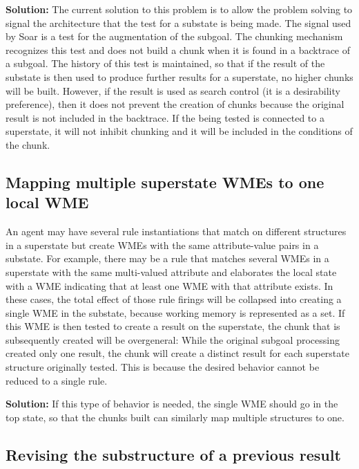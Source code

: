 \textbf{Solution:} The current solution to this problem is to allow the
problem solving to signal the architecture that the test for a substate is
being made.  The signal used by Soar is a test for the  augmentation of the subgoal.  The chunking mechanism recognizes this test
and does not build a chunk when it is found in a backtrace of a subgoal.  The
history of this test is maintained, so that if the result of the substate is
then used to produce further results for a superstate, no higher chunks will
be built.  However, if the result is used as search control (it is a
desirability preference), then it does not prevent the creation of chunks
because the original result is not included in the backtrace.  If the
 being tested is connected to a superstate, it will
not inhibit chunking and it will be included in the conditions of the chunk.

\subsection{Mapping multiple superstate WMEs to one local WME}

An agent may have several rule instantiations that match on different
structures in a superstate but create WMEs with the same attribute-value pairs
in a substate. For example, there may be a rule that matches several WMEs in a
superstate with the same multi-valued attribute and elaborates the local state
with a WME indicating that at least one WME with that attribute exists.  In
these cases, the total effect of those rule firings will be collapsed into
creating a single WME in the substate, because working memory is represented as
a set.  If this WME is then tested to create a result on the superstate, the
chunk that is subsequently created will be overgeneral: While the original
subgoal processing created only one result, the chunk will create a distinct
result for each superstate structure originally tested. This is because the
desired behavior cannot be reduced to a single rule.

\textbf{Solution:} If this type of behavior is needed, the single WME should go
in the top state, so that the chunks built can similarly map multiple
structures to one.

\subsection{Revising the substructure of a previous result}

